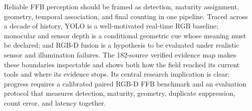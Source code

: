 Reliable FFB perception should be framed as detection, maturity assignment, geometry, temporal association, and final counting in one pipeline. Traced across a decade of history, YOLO is a well-motivated real-time RGB baseline; monocular and sensor depth is a conditional geometric cue whose meaning must be declared; and RGB-D fusion is a hypothesis to be evaluated under realistic sensor and illumination failures. The 182-source verified evidence map makes these boundaries inspectable and shows both how the field reached its current tools and where its evidence stops. Its central research implication is clear: progress requires a calibrated paired RGB-D FFB benchmark and an evaluation protocol that measures detection, maturity, geometry, duplicate suppression, count error, and latency together.
